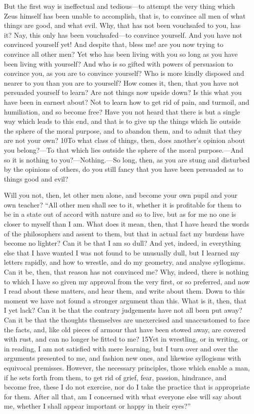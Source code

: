 But the first way is ineffectual and tedious—to attempt the very thing which Zeus himself has been unable to accomplish, that is, to convince all men of what things are good, and what evil. Why, that has not been vouchsafed to you, has it? Nay, this only has been vouchsafed—to convince yourself. And you have not convinced yourself yet! And despite that, bless me! are you now trying to convince all other men? Yet who has been living with you so long as you have been living with yourself? And who is so gifted with powers of persuasion to convince you, as you are to convince yourself? Who is more kindly disposed and nearer to you than you are to yourself? How comes it, then, that you have not persuaded yourself to learn? Are not things now upside down? Is this what you have been in earnest about? Not to learn how to get rid of pain, and turmoil, and humiliation, and so become free? Have you not heard that there is but a single way which leads to this end, and that is to give up the things which lie outside the sphere of the moral purpose, and to abandon them, and to admit that they are not your own? 10To what class of things, then, does another's opinion about you belong?—To that which lies outside the sphere of the moral purpose.—And so it is nothing to you?—Nothing.—So long, then, as you are stung and disturbed by the opinions of others, do you still fancy that you have been persuaded as to things good and evil?

Will you not, then, let other men alone, and become your own pupil and your own teacher? ``All other men shall see to it, whether it is profitable for them to be in a state out of accord with nature and so to live, but as for me no one is closer to myself than I am. What does it mean, then, that I have heard the words of the philosophers and assent to them, but that in actual fact my burdens have become no lighter? Can it be that I am so dull? And yet, indeed, in everything else that I have wanted I was not found to be unusually dull, but I learned my letters rapidly, and how to wrestle, and do my geometry, and analyse syllogisms. Can it be, then, that reason has not convinced me? Why, indeed, there is nothing to which I have so given my approval from the very first, or so preferred, and now I read about these matters, and hear them, and write about them. Down to this moment we have not found a stronger argument than this. What is it, then, that I yet lack? Can it be that the contrary judgements have not all been put away? Can it be that the thoughts themselves are unexercised and unaccustomed to face the facts, and, like old pieces of armour that have been stowed away, are covered with rust, and can no longer be fitted to me? 15Yet in wrestling, or in writing, or in reading, I am not satisfied with mere learning, but I turn over and over the arguments presented to me, and fashion new ones, and likewise syllogisms with equivocal premisses. However, the necessary principles, those which enable a man, if he sets forth from them, to get rid of grief, fear, passion, hindrance, and become free, these I do not exercise, nor do I take the practice that is appropriate for them. After all that, am I concerned with what everyone else will say about me, whether I shall appear important or happy in their eyes?''

